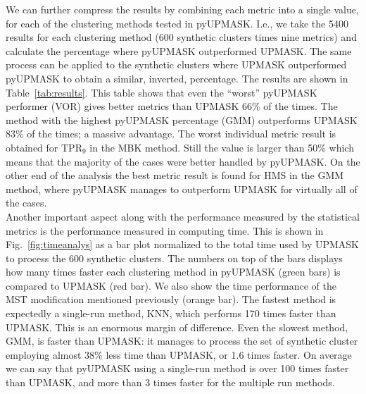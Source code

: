 \documentclass{aa}
\begin{document}
 We can further compress the results by combining each metric into a single
 value, for each of the clustering methods tested in pyUPMASK. I.e., we take
 the 5400 results for each clustering method (600 synthetic clusters times nine
 metrics) and calculate the percentage where pyUPMASK outperformed UPMASK.
 The same process can be applied to the synthetic clusters where
 UPMASK outperformed pyUPMASK to obtain a similar, inverted, percentage.
 The results are shown in Table~\ref{tab:results}.
 This table shows that even the ``worst'' pyUPMASK performer (VOR) gives
 better metrics than UPMASK 66\% of the times. The method  with the highest
 pyUPMASK percentage (GMM) outperforms UPMASK 83\% of the times; a massive
 advantage. The worst individual metric result is obtained for TPR$_9$ in the
 MBK method. Still the value is larger than 50\% which means that the majority
 of the cases were better handled by pyUPMASK. On the other end of the
 analysis the best metric result is found for HMS in the GMM method, where
 pyUPMASK manages to outperform UPMASK for virtually all of the cases.\\


 Another important aspect along with the performance measured by the
 statistical metrics is the performance measured in computing time. This is
 shown in Fig.~\ref{fig:timeanalys} as a bar plot normalized to the total time
 used by UPMASK to process the 600 synthetic clusters. The numbers on top of
 the bars displays how many times faster each clustering method in pyUPMASK
 (green bars) is compared to UPMASK (red bar). We also show the time
 performance of the MST modification mentioned previously (orange bar).
 The fastest method is expectedly a single-run method, KNN,
 which performs 170 times faster than UPMASK. This is an enormous margin of
 difference. Even the slowest method, GMM, is faster than UPMASK: it manages to
 process the set of synthetic cluster employing almost 38\% less time than
 UPMASK, or 1.6 times faster. On average we can say that pyUPMASK using a
 single-run method is over 100 times faster than UPMASK, and more than 3 times
 faster for the multiple run methods.\\
\end{document}
